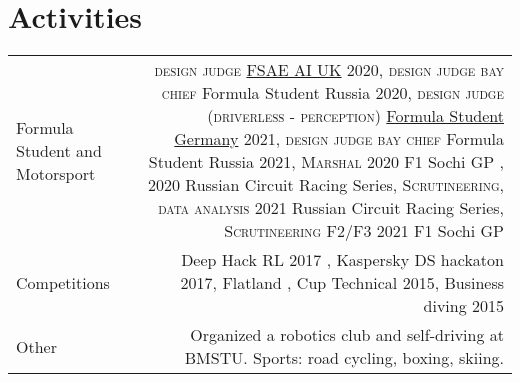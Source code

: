 \section*{\sectionformat Activities}
\begin{tabular}{@{}L!{\VRule}R}
    Formula Student and Motorsport &
    {\textsc{design judge}} \href{https://www.imeche.org/events/formula-student/team-information/fs-ai}{FSAE AI UK} 2020,
    {\textsc{design judge bay chief}} Formula Student Russia 2020,
    {\textsc{design judge (driverless - perception)}} \href{https://www.formulastudent.de/fsg/}{Formula Student Germany} 2021,
    {\textsc{design judge bay chief}} Formula Student Russia 2021,
    {\textsc{Marshal}} 2020 F1 Sochi GP , 2020 Russian Circuit Racing Series,
    {\textsc{Scrutineering, data analysis}} 2021 Russian Circuit Racing Series,
    {\textsc{Scrutineering F2/F3}} 2021 F1 Sochi GP
    \\
    Competitions                   &
    Deep Hack RL 2017 ,
    Kaspersky DS hackaton 2017,
    Flatland ,
    Cup Technical 2015,
    Business diving 2015
    \\
    Other                          &
    Organized a robotics club and self-driving at BMSTU.
    Sports: road cycling, boxing, skiing.
\end{tabular}